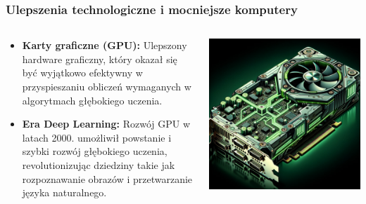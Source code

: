 \documentclass[smaller]{beamer}
\begin{document}
\begin{frame}
\frametitle{Ulepszenia technologiczne i mocniejsze komputery}

\begin{columns}
    \begin{column}{0.6\textwidth}
        \begin{itemize}
            \item \textbf{Karty graficzne (GPU):} Ulepszony hardware graficzny, który okazał się być wyjątkowo efektywny w przyspieszaniu obliczeń wymaganych w algorytmach głębokiego uczenia.
            \item \textbf{Era Deep Learning:} Rozwój GPU w latach 2000. umożliwił powstanie i szybki rozwój głębokiego uczenia, revolutionizując dziedziny takie jak rozpoznawanie obrazów i przetwarzanie języka naturalnego.
        \end{itemize}
    \end{column}

    \begin{column}{0.4\textwidth}
        \includegraphics[width=\textwidth]{../manifest/nvidia-gpu.png} %
    \end{column}
\end{columns}
\end{frame}
\end{document}

